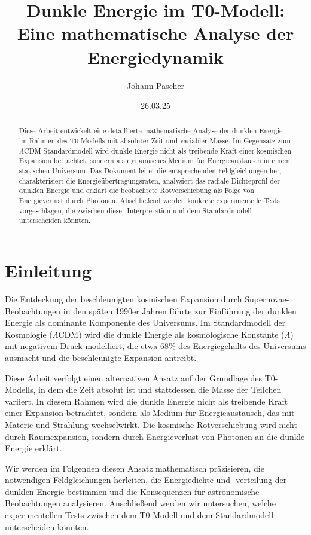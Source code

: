 \documentclass[a4paper,12pt]{article}
\theoremstyle{definition}
\theoremstyle{remark}
\begin{document}
	
	\title{Dunkle Energie im T0-Modell: \\Eine mathematische Analyse der Energiedynamik}
	\author{Johann Pascher}
	\date{26.03.25}
	\maketitle
	
	\begin{abstract}
		Diese Arbeit entwickelt eine detaillierte mathematische Analyse der dunklen Energie im Rahmen des T0-Modells mit absoluter Zeit und variabler Masse. Im Gegensatz zum $\Lambda$CDM-Standardmodell wird dunkle Energie nicht als treibende Kraft einer kosmischen Expansion betrachtet, sondern als dynamisches Medium für Energieaustausch in einem statischen Universum. Das Dokument leitet die entsprechenden Feldgleichungen her, charakterisiert die Energieübertragungsraten, analysiert das radiale Dichteprofil der dunklen Energie und erklärt die beobachtete Rotverschiebung als Folge von Energieverlust durch Photonen. Abschließend werden konkrete experimentelle Tests vorgeschlagen, die zwischen dieser Interpretation und dem Standardmodell unterscheiden könnten.
	\end{abstract}
	
	\tableofcontents
	\newpage
	
	\section{Einleitung}
	Die Entdeckung der beschleunigten kosmischen Expansion durch Supernovae-Beobachtungen in den späten 1990er Jahren führte zur Einführung der dunklen Energie als dominante Komponente des Universums. Im Standardmodell der Kosmologie ($\Lambda$CDM) wird die dunkle Energie als kosmologische Konstante ($\Lambda$) mit negativem Druck modelliert, die etwa 68\% des Energiegehalts des Universums ausmacht und die beschleunigte Expansion antreibt.
	
	Diese Arbeit verfolgt einen alternativen Ansatz auf der Grundlage des T0-Modells, in dem die Zeit absolut ist und stattdessen die Masse der Teilchen variiert. In diesem Rahmen wird die dunkle Energie nicht als treibende Kraft einer Expansion betrachtet, sondern als Medium für Energieaustausch, das mit Materie und Strahlung wechselwirkt. Die kosmische Rotverschiebung wird nicht durch Raumexpansion, sondern durch Energieverlust von Photonen an die dunkle Energie erklärt.
	
	Wir werden im Folgenden diesen Ansatz mathematisch präzisieren, die notwendigen Feldgleichungen herleiten, die Energiedichte und -verteilung der dunklen Energie bestimmen und die Konsequenzen für astronomische Beobachtungen analysieren. Anschließend werden wir untersuchen, welche experimentellen Tests zwischen dem T0-Modell und dem Standardmodell unterscheiden könnten.
	
\end{document}
